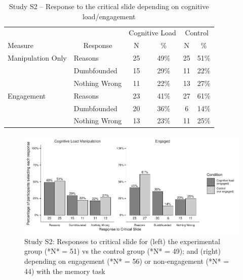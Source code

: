 \documentclass[
  american,
  man,floatsintext]{apa7}
\begin{document}
\begin{table}[tbp]

\begin{center}
\begin{threeparttable}

\caption{\label{tab:tabS2tab1dumb1all}Study S2 – Response to the critical slide depending on cognitive load/engagement}

\begin{tabular}{llcccc}
\toprule
 &  & \multicolumn{2}{c}{Cognitive Load} & \multicolumn{2}{c}{Control} \\
\cmidrule(r){3-4} \cmidrule(r){5-6}
Measure & \multicolumn{1}{c}{Response} & \multicolumn{1}{c}{N} & \multicolumn{1}{c}{\%} & \multicolumn{1}{c}{N} & \multicolumn{1}{c}{\%}\\
\midrule
Manipulation Only & Reasons & 25 & 49\% & 25 & 51\%\\
 & Dumbfounded & 15 & 29\% & 11 & 22\%\\
 & Nothing Wrong & 11 & 22\% & 13 & 27\%\\
Engagement & Reasons & 23 & 41\% & 27 & 61\%\\
 & Dumbfounded & 20 & 36\% & 6 & 14\%\\
 & Nothing Wrong & 13 & 23\% & 11 & 25\%\\
\bottomrule
\end{tabular}

\end{threeparttable}
\end{center}

\end{table}

\begin{figure}[!h]
\includegraphics{Supplementary_files/figure-latex/S2figboth-1} \caption{Study S2: Responses to critical slide for (left) the experimental group (*N* = 51) vs the control group (*N* = 49); and (right) depending on engagement (*N* = 56) or non-engagement (*N* = 44) with the memory task}\label{fig:S2figboth}
\end{figure}
\end{document}
